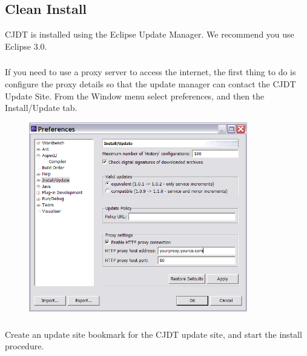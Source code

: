 \subsection{Clean Install} CJDT is
installed using the Eclipse Update Manager. We recommend you use Eclipse 3.0.\\
\subsubsection{} If you need to use a proxy server to access the internet, the first thing
to do is configure the proxy details so that the update manager can contact the
CJDT Update Site. From the Window menu select preferences, and then the
Install/Update tab.\\
\begin{figure}[htbp]
	\centering
		\includegraphics[width=0.85\textwidth]{./images/proxy.png}
	\label{fig:proxy}
\end{figure}
\newpage
\subsubsection{} Create an update site bookmark for the CJDT update site, and start the
install procedure.
